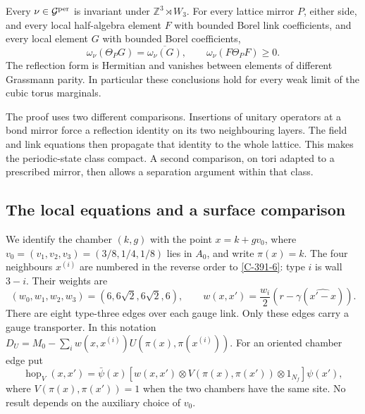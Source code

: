 \documentclass[11pt,letterpaper,reqno]{amsart}
\makeatletter
\theoremstyle{definition}
\newcommand{\ms@minorstart}{%
  \pushQED{\qed}\renewcommand{\qedsymbol}{$\blacksquare$}}
\newenvironment{proposition}[1][]{\ms@minorstart\ms@proposition[#1]}
  {\popQED\endms@proposition}
\theoremstyle{remark}
\makeatother
\begin{document}
\begin{proposition}[All lattice mirrors]\label{C-386-13}
Every $\nu\in\mathcal G^{\rm per}$ is invariant under
$\mathbb Z^3\rtimes W_3$. For every lattice mirror $P$, either
side, and every local half-algebra element $F$ with bounded Borel
link coefficients, and every local element $G$ with bounded Borel
coefficients,
\[
 \omega_\nu(\Theta_PG)=\overline{\omega_\nu(G)},\qquad
 \omega_\nu(F\Theta_PF)\ge0.
\]
The reflection form is Hermitian and vanishes between elements of
different Grassmann parity. In particular these conclusions hold
for every weak limit of the cubic torus marginals.
\end{proposition}

The proof uses two different comparisons. Insertions of unitary
operators at a bond mirror force a reflection identity on its two
neighbouring layers. The field and link equations then propagate
that identity to the whole lattice. This makes the periodic-state
class compact. A second comparison, on tori adapted to a prescribed
mirror, then allows a separation argument within that class.

\subsection{The local equations and a surface comparison}

We identify the chamber $(k,g)$ with the point $x=k+gv_0$,
where $v_0=(v_1,v_2,v_3)=(3/8,1/4,1/8)$ lies in $A_0$,
and write $\pi(x)=k$.
The four neighbours $x^{(i)}$ are numbered in the reverse order
to \eqref{C-391-6}: type $i$ is wall $3-i$. Their weights are
\[
 (w_0,w_1,w_2,w_3)=(6,6\sqrt2,6\sqrt2,6),\qquad
 w(x,x')=\frac{w_i}{2}(r-\gamma(\widehat{x'-x})).
\]
There are eight type-three edges over each gauge link. Only these
edges carry a gauge transporter. In this notation
$D_U=M_0-\sum_i w(x,x^{(i)})U(\pi(x),\pi(x^{(i)}))$.
For an oriented chamber edge put
\[
 \operatorname{hop}_V(x,x')=
 \bar\psi(x)[w(x,x')\otimes V(\pi(x),\pi(x'))\otimes1_{N_f}]\psi(x'),
\]
where $V(\pi(x),\pi(x'))=1$ when the two chambers have the same site.
No result depends on the auxiliary choice of $v_0$.
\end{document}
